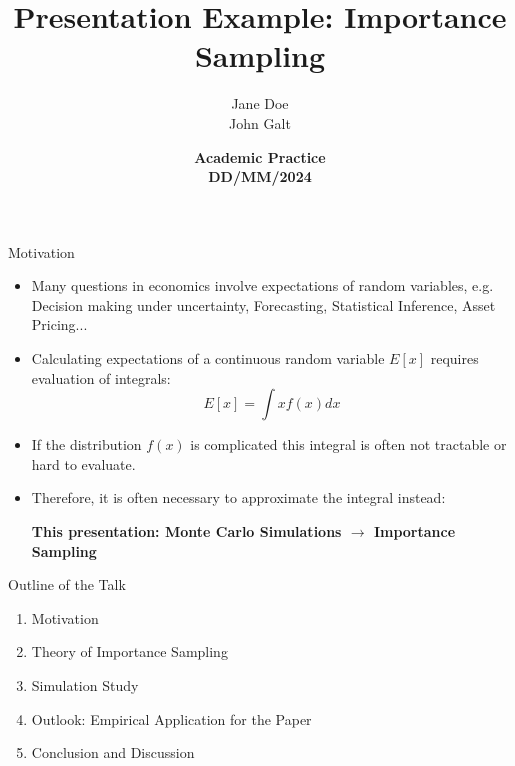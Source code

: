 \documentclass[10pt]{beamer}
\title{Presentation Example: Importance Sampling}
\author{
Jane Doe \\
John Galt
}
\date{\vspace{2cm}  \textbf{\large{Academic Practice}} \\ \textbf{DD/MM/2024}}
\begin{document}
\maketitle


\begin{frame}{Motivation}
\begin{itemize}
    \item Many questions in economics involve expectations of random variables, e.g. Decision making under uncertainty, Forecasting, Statistical Inference, Asset Pricing...
    \pause
    \item Calculating expectations of a continuous random variable $E[x]$ requires evaluation of integrals:
    \begin{equation*}
        E[x] = \int x f(x) dx
    \end{equation*}
    \pause
    \item If the distribution $f(x)$ is complicated this integral is often not tractable or hard to evaluate.
    \pause
    \item Therefore, it is often necessary to approximate the integral instead:
\begin{center}
    \textbf{This presentation: Monte Carlo Simulations $\rightarrow$ Importance Sampling}
\end{center}


\end{itemize}


\end{frame}



\begin{frame}{Outline of the Talk}
\begin{large}
\begin{enumerate}
    \item Motivation \checkmark
    \item Theory of Importance Sampling
    \item Simulation Study
    \item Outlook: Empirical Application for the Paper
    \item Conclusion and Discussion
\end{enumerate}
\end{large}
\end{frame}
\end{document}
